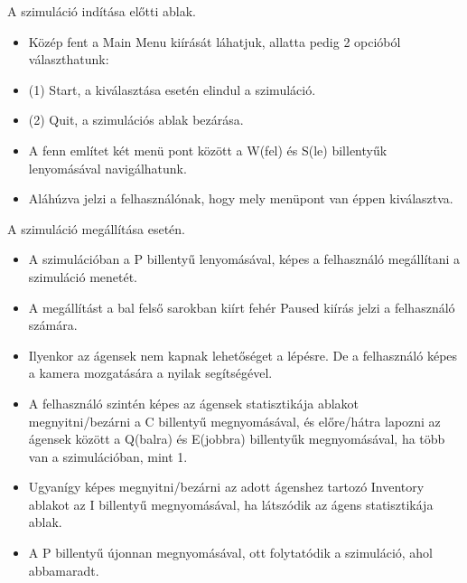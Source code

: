 
A szimuláció indítása előtti ablak.

\begin{itemize}
    \item Közép fent a Main Menu kiírását láhatjuk, allatta pedig 2 opcióból választhatunk:
    \item (1) Start, a kiválasztása esetén elindul a szimuláció.
    \item (2) Quit, a szimulációs ablak bezárása.
    \item A fenn említet két menü pont között a W(fel) és S(le) billentyűk lenyomásával navigálhatunk.
    \item Aláhúzva jelzi a felhasználónak, hogy mely menüpont van éppen kiválasztva.
\end{itemize}

A szimuláció megállítása esetén.

\begin{itemize}
    \item A szimulációban a P billentyű lenyomásával, képes a felhasználó megállítani a szimuláció menetét.
    \item A megállítást a bal felső sarokban kiírt fehér Paused kiírás jelzi a felhasználó számára.
    \item Ilyenkor az ágensek nem kapnak lehetőséget a lépésre. De a felhasználó képes a kamera mozgatására a nyilak segítségével.
    \item A felhasználó szintén képes az ágensek statisztikája ablakot megnyitni/bezárni a C billentyű megnyomásával, és előre/hátra lapozni az ágensek között a Q(balra) és E(jobbra) billentyűk megnyomásával, ha több van a szimulációban, mint 1.
    \item Ugyanígy képes megnyitni/bezárni az adott ágenshez tartozó Inventory ablakot az I billentyű megnyomásával, ha látszódik az ágens statisztikája ablak.
    \item A P billentyű újonnan megnyomásával, ott folytatódik a szimuláció, ahol abbamaradt.
\end{itemize}


\label{UI}

